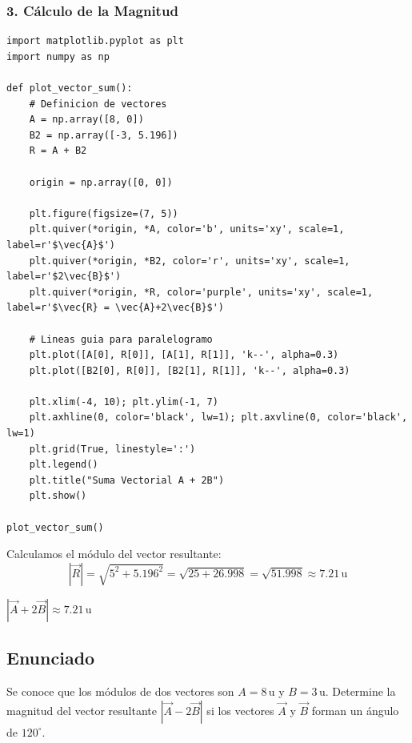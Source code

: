 \documentclass[12pt, a4paper]{article}
\begin{document}
\subsubsection*{3. Cálculo de la Magnitud}
\begin{lstlisting}
import matplotlib.pyplot as plt
import numpy as np

def plot_vector_sum():
    # Definicion de vectores
    A = np.array([8, 0])
    B2 = np.array([-3, 5.196])
    R = A + B2
    
    origin = np.array([0, 0])
    
    plt.figure(figsize=(7, 5))
    plt.quiver(*origin, *A, color='b', units='xy', scale=1, label=r'$\vec{A}$')
    plt.quiver(*origin, *B2, color='r', units='xy', scale=1, label=r'$2\vec{B}$')
    plt.quiver(*origin, *R, color='purple', units='xy', scale=1, label=r'$\vec{R} = \vec{A}+2\vec{B}$')
    
    # Lineas guia para paralelogramo
    plt.plot([A[0], R[0]], [A[1], R[1]], 'k--', alpha=0.3)
    plt.plot([B2[0], R[0]], [B2[1], R[1]], 'k--', alpha=0.3)
    
    plt.xlim(-4, 10); plt.ylim(-1, 7)
    plt.axhline(0, color='black', lw=1); plt.axvline(0, color='black', lw=1)
    plt.grid(True, linestyle=':')
    plt.legend()
    plt.title("Suma Vectorial A + 2B")
    plt.show()

plot_vector_sum()
\end{lstlisting}

Calculamos el módulo del vector resultante:
\begin{equation*}
    |\vec{R}| = \sqrt{5^2 + 5.196^2} = \sqrt{25 + 26.998} = \sqrt{51.998} \approx 7.21 \, \text{u}
\end{equation*}

\begin{tcolorbox}[colback=green!5!white, colframe=green!50!black, title=Respuesta Final]
\centering \Large $|\vec{A} + 2\vec{B}| \approx 7.21 \, \text{u}$
\end{tcolorbox}

\newpage

\subsection*{Enunciado}
Se conoce que los módulos de dos vectores son $A = 8 \, \text{u}$ y $B = 3 \, \text{u}$. Determine la magnitud del vector resultante $|\vec{A} - 2\vec{B}|$ si los vectores $\vec{A}$ y $\vec{B}$ forman un ángulo de $120^\circ$.
\end{document}
